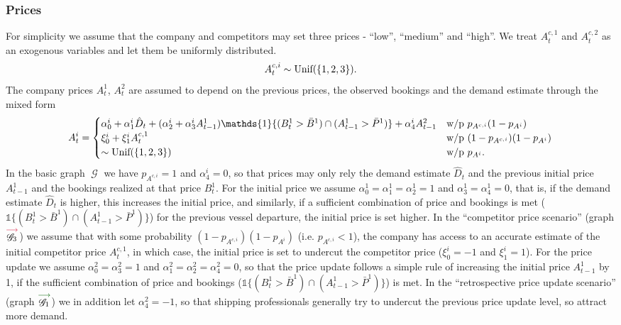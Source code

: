 \documentclass[12pt,a4paper]{article}
\theoremstyle{definition}
\DeclareMathOperator{\gG}{\mathscr{G}}
\begin{document}
\subsubsection*{Prices}
For simplicity we assume that the company and competitors may set three prices - ``low'', ``medium'' and ``high''. We treat $A^{c, 1}_t$ and $A^{c, 2}_t$ as an exogenous variables and let them be uniformly distributed.
\[
    A^{c, i}_t \sim \textup{Unif}(\{1, 2, 3\}).
\]
The company prices $A^1_t$, $A^2_t$ are assumed to depend on the previous prices, the observed bookings and the demand estimate through the mixed form
\[
  A^i_t =
    \begin{cases}
        \alpha^i_0 + \alpha^i_1 \hat{D}_t + (\alpha^i_2 + \alpha^i_3 A^1_{t-1}) \mathds{1}\{(B^1_t > \bar{B}^1) \cap (A^1_{t-1} > \bar{P}^1)\} + \alpha^i_4 A^2_{t-1}  & \textup{w/p $p_{A^{c, i}}(1 - p_{A^i})$} \\
        \xi^i_0 + \xi^i_1 A^{c, 1}_t & \textup{w/p $(1 - p_{A^{c, i}})(1 - p_{A^i})$} \\
        \sim \textup{Unif}(\{1, 2, 3\}) &\textup{w/p} ~ p_{A^i}.
    \end{cases}
\]
In the basic graph $\gG$ we have $p_{A^{c, i}} = 1$ and $\alpha_4^i = 0$, so that prices may only rely the demand estimate $\hat{D}_t$ and the previous initial price $A^1_{t-1}$ and the bookings realized at that price $B^1_t$.
For the initial price we assume $\alpha^1_0 = \alpha^1_1 = \alpha^1_2 = 1$ and $\alpha^1_3 = \alpha^1_4 = 0$, that is, if the demand estimate $\hat{D}_t$ is higher, this increases the initial price, and similarly, if a sufficient combination of price and bookings is met ($\mathds{1}\{(B^1_t > \bar{B}^1) \cap (A^1_{t-1} > \bar{P}^1)\}$) for the previous vessel departure, the initial price is set higher. In the ``competitor price scenario'' (graph $\overset{\textcolor{graphRed}{\longrightarrow}}{\gG_3}$) we assume that with some probability $(1 - p_{A^{c, i}})(1 - p_{A^i})$ (i.e. $p_{A^{c, i}} < 1$), the company has access to an accurate estimate of the initial competitor price $A_t^{c, 1}$, in which case, the initial price is set to undercut the competitor price ($\xi^i_0=-1$ and $\xi^i_1 = 1$).
For the price update we assume $\alpha^2_0 = \alpha^2_3 = 1$ and $\alpha^2_1 = \alpha^2_2 = \alpha^2_4 = 0$, so that the price update follows a simple rule of increasing the initial price $A^1_{t-1}$ by 1, if the sufficient combination of price and bookings ($\mathds{1}\{(B^1_t > \bar{B}^1) \cap (A^1_{t-1} > \bar{P}^1)\}$) is met. In the ``retrospective price update scenario'' (graph $\overset{\textcolor{graphGreen}{\longrightarrow}}{\gG_1}$)  we in addition let $\alpha^2_4 = -1$, so that shipping professionals generally try to undercut the previous price update level, so attract more demand.
\end{document}
